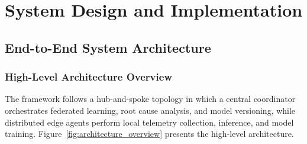 \chapter{System Design and Implementation}
\label{ch:system_design}

\section{End-to-End System Architecture}
\label{sec:design_architecture}

\subsection{High-Level Architecture Overview}
\label{subsec:design_arc_overview}

The framework follows a hub-and-spoke topology in which a central coordinator
orchestrates federated learning, root cause analysis, and model versioning,
while distributed edge agents perform local telemetry collection, inference,
and model training. Figure~\ref{fig:architecture_overview} presents the
high-level architecture.

